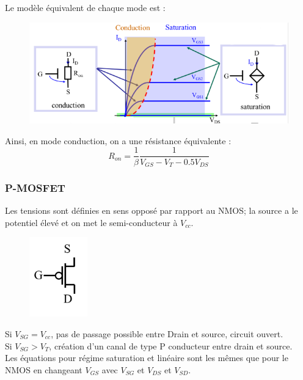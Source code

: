 \documentclass[../main.tex]{subfiles}
\begin{document}
Le modèle équivalent de chaque mode est : \\

\begin{figure}[hbt!]
    \centering
    \includegraphics[width=.5\textwidth]{IMAGES/elec/Screenshot from 2023-12-11 13-51-52.png}
\end{figure}

Ainsi, en mode conduction, on a une résistance équivalente : \begin{equation}
    R_{on} = \frac{1}{\beta} \frac{1}{V_{GS}-V_T-0.5V_{DS}}
\end{equation}

\subsubsection{P-MOSFET}
Les tensions sont définies en sens opposé par rapport au NMOS; la source a le potentiel élevé et on met le semi-conducteur à $V_{cc}$.\\

\begin{figure}[hbt!]
    \centering
    \includegraphics[width=.3\textwidth]{IMAGES/elec/Screenshot from 2023-12-11 13-54-40.png}
\end{figure}

Si $V_{SG} = V_{cc}$, pas de passage possible entre Drain et source, circuit ouvert.\\

Si $V_{SG}> V_T$, création d'un canal de type P conducteur entre drain et source.\\

Les équations pour régime saturation et linéaire sont les mêmes que pour le NMOS en changeant $V_{GS}$ avec $V_{SG}$ et $V_{DS}$ et $V_{SD}$.\\
\end{document}
